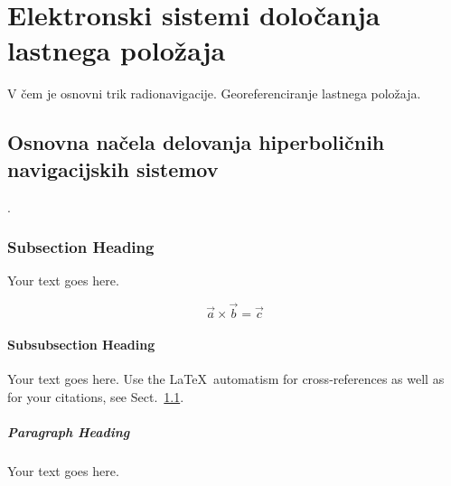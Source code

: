 %
\chapter{Elektronski sistemi določanja lastnega položaja}
\label{intro} %

V čem je osnovni trik radionavigacije. Georeferenciranje lastnega položaja.

\section{Osnovna načela delovanja hiperboličnih navigacijskih sistemov}
\label{sec:1}
\cite{monograph}.

\subsection{Subsection Heading}
\label{sec:2}
Your text goes here.

\begin{equation}
	\vec{a}\times\vec{b}=\vec{c}
\end{equation}

\subsubsection{Subsubsection Heading}
Your text goes here. Use the \LaTeX\ automatism for cross-references as
well as for your citations, see Sect.~\ref{sec:1}.

\paragraph{Paragraph Heading} %
Your text goes here.

